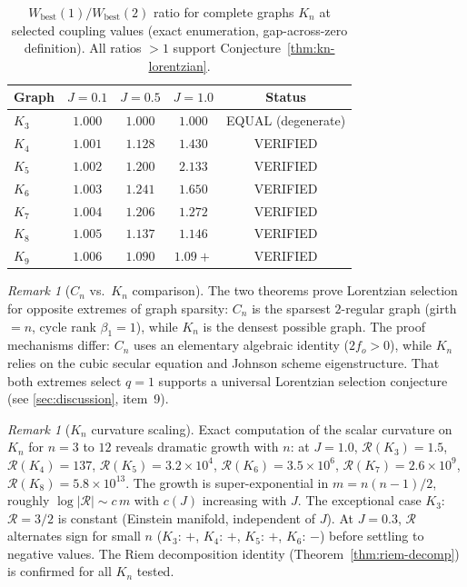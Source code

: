\documentclass[11pt]{article}
\theoremstyle{definition}
\theoremstyle{remark}
\newtheorem{remark}[theorem]{Remark}
\newcommand{\betti}{\beta_1}
\newcommand{\Scal}{\mathcal{R}}
\begin{document}
\begin{table}[ht]
\centering
\caption{$W_{\mathrm{best}}(1)/W_{\mathrm{best}}(2)$ ratio for complete graphs
$K_n$ at selected coupling values (exact enumeration, gap-across-zero definition).
All ratios $> 1$ support Conjecture~\ref{thm:kn-lorentzian}.}
\label{tab:kn-wq}
\renewcommand{\arraystretch}{1.3}
\begin{tabular}{lcccc}
\toprule
Graph & $J=0.1$ & $J=0.5$ & $J=1.0$ & Status \\
\midrule
$K_3$ & $1.000$ & $1.000$ & $1.000$ & EQUAL (degenerate) \\
$K_4$ & $1.001$ & $1.128$ & $1.430$ & VERIFIED \\
$K_5$ & $1.002$ & $1.200$ & $2.133$ & VERIFIED \\
$K_6$ & $1.003$ & $1.241$ & $1.650$ & VERIFIED \\
$K_7$ & $1.004$ & $1.206$ & $1.272$ & VERIFIED \\
$K_8$ & $1.005$ & $1.137$ & $1.146$ & VERIFIED \\
$K_9$ & $1.006$ & $1.090$ & $1.09+$ & VERIFIED \\
\bottomrule
\end{tabular}
\end{table}

\begin{remark}[$C_n$ vs.\ $K_n$ comparison]
The two theorems prove Lorentzian selection for opposite extremes of graph
sparsity: $C_n$ is the sparsest $2$-regular graph (girth $= n$, cycle rank
$\betti = 1$), while $K_n$ is the densest possible graph. The proof mechanisms
differ: $C_n$ uses an elementary algebraic identity ($2f_o > 0$), while $K_n$
relies on the cubic secular equation and Johnson scheme eigenstructure. That
both extremes select $q = 1$ supports a universal Lorentzian selection
conjecture (see \cref{sec:discussion}, item~9).
\end{remark}

\begin{remark}[$K_n$ curvature scaling]
\label{rem:kn-scaling}
Exact computation of the scalar curvature on $K_n$ for $n = 3$ to $12$
reveals dramatic growth with $n$: at $J = 1.0$, $\Scal(K_3) = 1.5$,
$\Scal(K_4) = 137$, $\Scal(K_5) = 3.2 \times 10^{4}$,
$\Scal(K_6) = 3.5 \times 10^{6}$, $\Scal(K_7) = 2.6 \times 10^{9}$,
$\Scal(K_8) = 5.8 \times 10^{13}$.
The growth is super-exponential in $m = n(n{-}1)/2$, roughly
$\log |\Scal| \sim c\,m$ with $c(J)$ increasing with $J$.
The exceptional case $K_3$: $\Scal = 3/2$ is constant (Einstein manifold,
independent of $J$). At $J = 0.3$, $\Scal$ alternates sign for small $n$
($K_3$: $+$, $K_4$: $+$, $K_5$: $+$, $K_6$: $-$) before settling to
negative values.
The Riem decomposition identity (Theorem~\ref{thm:riem-decomp})
is confirmed for all $K_n$ tested.
\end{remark}
\end{document}
